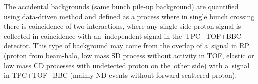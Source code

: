 \begin{comment}
The selection of Zerobias events may provide some bias to the normalization of the~accidental background. As a systematic check, the criteria for  Zerobias selection were changed~to:
 \begin{enumerate}
 	\item no trigger in any RP or trigger in exactly one arm (two RPs) with \textit{no more} than one reconstructed proton track in that arm,
 	\item veto on any signal in small BBC tiles or ZDC on the same  side of the IP as  RP under study,
 	\item no reconstructed vertex in TPC or exactly one vertex (not necessarily  with two TOF-matched tracks passing the quality criteria). The requirement of signal in BBC small tiles remains unchanged. 
 \end{enumerate}
 As a result of this change in the procedure, the accidental background normalization increases twice with respect to the nominal value. Therefore, the background changes by $\pm50\%$ was taken as a systematic uncertainty related to the accidentals.

\end{comment}
The accidental backgrounds (same bunch pile-up background) are quantified using data-driven method and defined as a process where in  single bunch crossing there is coincidence of two interactions, where any single-side proton signal is collected in coincidence with an~independent signal in the~TPC+TOF+BBC detector. %
This type of background may come from the overlap of a~signal in \ac{RP} (proton from beam-halo, low mass \ac{SD} process without activity in TOF, elastic or low mass \ac{CD} processes with undetected proton on the~other side) with a~signal in TPC+TOF+BBC (mainly \ac{ND} events without forward-scattered proton).

